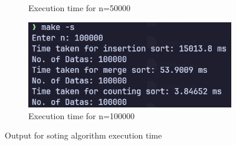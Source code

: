 \begin{figure}[H]
\begin{subfigure}[b]{0.4\textwidth}
        \caption{Execution time for n=50000}
    \end{subfigure}
    \hfill
    \begin{subfigure}[b]{0.4\textwidth}
        \centering
        \includegraphics[width=\textwidth]{./img/out-4.png}
        \caption{Execution time for n=100000}
    \end{subfigure}
    
    \caption{Output for soting algorithm execution time}

\end{figure}

